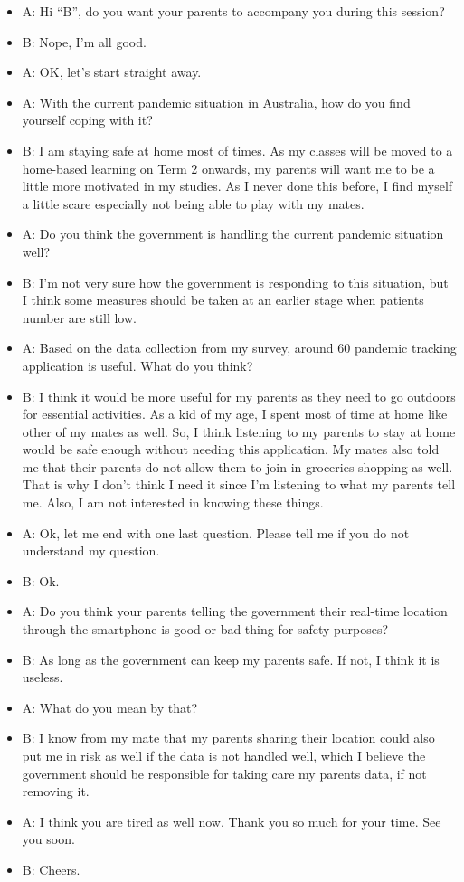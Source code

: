 \begin{appendices}
      \begin{itemize}
        \item A: Hi “B”, do you want your parents to accompany you during this session?
        \item B: Nope, I’m all good.
        \item A: OK, let’s start straight away.
        \item A: With the current pandemic situation in Australia, how do you find yourself coping with it?
        \item B: I am staying safe at home most of times. As my classes will be moved to a home-based
  learning on Term 2 onwards, my parents will want me to be a little more motivated in my
  studies. As I never done this before, I find myself a little scare especially not being able to
  play with my mates.
        \item A: Do you think the government is handling the current pandemic situation well?
        \item B: I’m not very sure how the government is responding to this situation, but I think some
  measures should be taken at an earlier stage when patients number are still low.
        \item A: Based on the data collection from my survey, around 60%
  pandemic tracking application is useful. What do you think?
        \item B: I think it would be more useful for my parents as they need to go outdoors for essential
  activities. As a kid of my age, I spent most of time at home like other of my mates as well. So,
  I think listening to my parents to stay at home would be safe enough without needing this
  application. My mates also told me that their parents do not allow them to join in groceries
  shopping as well. That is why I don’t think I need it since I’m listening to what my parents
  tell me. Also, I am not interested in knowing these things.
        \item A: Ok, let me end with one last question. Please tell me if you do not understand my question.
        \item B: Ok.
        \item A: Do you think your parents telling the government their real-time location through the
  smartphone is good or bad thing for safety purposes?
        \item B: As long as the government can keep my parents safe. If not, I think it is useless.
        \item A: What do you mean by that?
        \item B: I know from my mate that my parents sharing their location could also put me in risk as well
  if the data is not handled well, which I believe the government should be responsible for taking
  care my parents data, if not removing it.
        \item A: I think you are tired as well now. Thank you so much for your time. See you soon.
        \item B: Cheers.
      \end{itemize}


\end{appendices}

